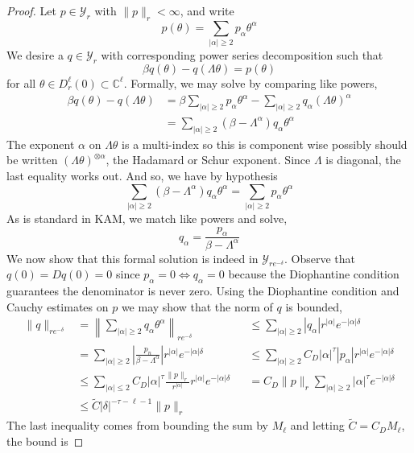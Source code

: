 \documentclass{article}
\newcommand{\C}{\mathbb{C}}
\newcommand{\Y}{\mathcal{Y}}
\theoremstyle{plain}
\theoremstyle{remark}
\begin{document}
\begin{proof}
Let $p \in \Y_r$ with $\| p \|_r < \infty$, and write
\[
p(\theta) = \sum_{|\alpha|\geq 2} p_\alpha \theta^\alpha
\]
We desire a $q \in \Y_r$ with corresponding power series decomposition such that
\[
\beta q(\theta) - q ( \Lambda \theta) = p ( \theta)
\]
for all $\theta \in D_r^\ell(0) \subset \C^\ell$.
Formally, we may solve by comparing like powers,
\begin{align*}
\beta q(\theta) - q(\Lambda \theta) &= \beta \sum_{|\alpha|\geq 2} p_\alpha \theta^\alpha - \sum_{|\alpha|\geq 2} q_\alpha (\Lambda \theta)^\alpha\\
&= \sum_{|\alpha|\geq 2} (\beta - \Lambda^\alpha)q_\alpha\theta^\alpha
\end{align*}
The exponent $\alpha$ on $\Lambda \theta$ is a multi-index so this is component wise possibly should be written $(\Lambda \theta)^{\otimes \alpha}$, the Hadamard or Schur exponent. 
Since $\Lambda$ is diagonal, the last equality works out. 
And so, we have by hypothesis
\begin{equation*}
\sum_{|\alpha|\geq 2} (\beta - \Lambda^\alpha)q_\alpha\theta^\alpha = \sum_{|\alpha|\geq 2} p_\alpha \theta^\alpha
\end{equation*}
As is standard in KAM, we match like powers and solve,
\[
q_\alpha = \frac{p_\alpha}{\beta - \Lambda^\alpha}
\]
We now show that this formal solution is indeed in $\Y_{re^{-\delta}}$. 
Observe that $q(0) = Dq(0) = 0$ since $p_\alpha = 0 \Leftrightarrow q_\alpha = 0$ because the Diophantine condition guarantees the denominator is never zero. 
Using the Diophantine condition and Cauchy estimates on $p$ we may show that the norm of $q$ is bounded,
\begin{align*}
\|q\|_{re^{-\delta}} & = \left\| \sum_{|\alpha|\geq 2} q_\alpha \theta^\alpha\right\|_{re^{-\delta}} && \leq \sum_{|\alpha|\geq 2} |q_\alpha|r^{|\alpha|}e^{-|\alpha|\delta}\\
& = \sum_{|\alpha|\geq 2} \left| \frac{p_n}{\beta - \Lambda^\alpha} \right| r^{|\alpha|}e^{-|\alpha|\delta} && \leq \sum_{|\alpha|\geq 2} C_D |\alpha|^\tau |p_\alpha| r^{|\alpha|} e^{-|\alpha|\delta}\\
& \leq \sum_{|\alpha|\leq 2} C_D |\alpha|^\tau \frac{\|p\|_{r}}{r^{|\alpha|}}r^{|\alpha|}e^{-|\alpha|\delta} && = C_D \|p\|_r \sum_{|\alpha|\geq 2} |\alpha|^\tau e^{-|\alpha|\delta}\\
& \leq \tilde{C}|\delta|^{-\tau-\ell-1}\|p\|_r
\end{align*}
The last inequality comes from bounding the sum by $M_\ell$ and letting $\tilde{C} = C_D M_\ell$, the bound is 

\end{proof}
\end{document}
